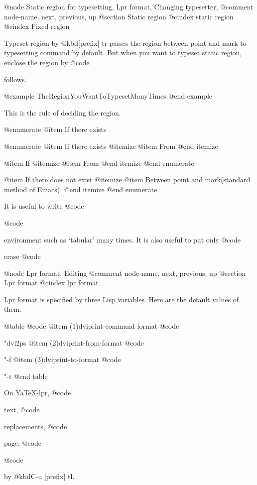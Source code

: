 {{{{@node Static region for typesetting, Lpr format, Changing typesetter, %
@comment  node-name,  next,  previous,  up
@section Static region
@cindex static region
@cindex Fixed region

  Typeset-region by @kbd{[prefix] tr} passes the region between point and
mark to typesetting command by default.  But when you want to typeset
static region, enclose the region by @code{%
follows.

@example
	  TheRegionYouWantToTypesetManyTimes
@end example

This is the rule of deciding the region.

@enumerate
@item
If there exists %

@enumerate
@item
If there exists %
@itemize
@item From %
@end itemize

@item
If %
@itemize
@item From %
@end itemize
@end enumerate

@item
If there does not exist %
@itemize
@item Between point and mark(standard method of Emacs).
@end itemize
@end enumerate

  It is useful to write @code{%
@code{%
environment such as `tabular' many times.  It is also useful to put only
@code{%
erase @code{%

@node Lpr format, Editing %
@comment  node-name,  next,  previous,  up
@section Lpr format
@cindex lpr format

  Lpr format is specified by three Lisp variables.  Here are the
default values of them.

@table @code
@item (1)dviprint-command-format
	@code{"dvi2ps %
@item (2)dviprint-from-format
	@code{"-f %
@item (3)dviprint-to-format
	@code{"-t %
@end table

  On YaTeX-lpr, @code{%
text, @code{%
replacements, @code{%
page, @code{%
@code{%
by @kbd{C-u [prefix] tl}.

}}}}}}}}}}}}}}}}}
